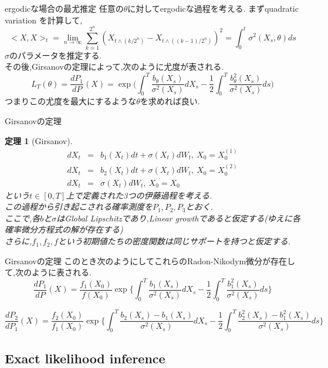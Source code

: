 \documentclass[dvipdfmx,cjk]{beamer}
\numberwithin{equation}{section}
\newtheorem{Thm}     {定理}[section]
\def\thm{\begin{Thm}}
\def\thmx{\end{Thm}}
\def\eqa{\begin{eqnarray}}
\def\eqax{\end{eqnarray}}
\begin{document}
\begin{frame}{ergodicな場合の最尤推定}
任意の$\theta$に対してergodicな過程を考える.\pause 
まずquadratic variation を計算して,
\[
<X,X>_t = \lim_{n\to\infty} \sum_{k=1}^{2^n} (X_{t\wedge (k/2^n)} - X_{t\wedge ((k-1)/2^n)})^2 =
\int_0^t \sigma^2(X_s,\theta)ds 
\]
$\sigma$のパラメータを推定する.\\ \pause
その後,Girsanovの定理によって,次のように尤度が表される.
\[
L_T(\theta) = \frac{dP_1}{dP}(X)  
	= \exp \biggl( \int_0^T \frac{b_\theta(X_s)}{\sigma^2(X_s)} dX_s - 
	\frac{1}{2} \int_0^T \frac{ b_\theta^2(X_s) }{\sigma^2(X_s)} ds
	 \biggl)
\]
つまりこの尤度を最大にするような$\theta$を求めれば良い.\\

\end{frame}

\begin{frame}{Girsanovの定理}
\thm[Girsanov]
\eqa
dX_t &=& b_1(X_t) dt + \sigma(X_t) dW_t ,\ X_0 = X_0^{(1)} \\
dX_t &=& b_2(X_t) dt + \sigma(X_t) dW_t ,\ X_0 = X_0^{(2)} \\
dX_t &=& \sigma(X_t) dW_t ,\ X_0 = X_0
\eqax
という$t\in [0,T]$上で定義された3つの伊藤過程を考える.\\
この過程から引き起こされる確率測度を$P_1,P_2,P_3$とおく.\\
ここで,各$b$と$\sigma$はGlobal Lipschitzであり,Linear growthであると仮定する(ゆえに各確率微分方程式の解が存在する)\\
さらに,$f_1,f_2,f$という初期値たちの密度関数は同じサポートを持つと仮定する.\\

\thmx

\end{frame}
\begin{frame}{Girsanovの定理}
このとき次のようにしてこれらのRadon-Nikodym微分が存在して,次のように表される.
\[
\frac{dP_1}{dP}(X) = \frac{f_1(X_0)}{f(X_0)} 
\exp \biggl\{
	\int_0^T \frac{b_1(X_s)}{\sigma^2(X_s)} dX_s - 
	\frac{1}{2} \int_0^T \frac{ b_1^2(X_s) }{\sigma^2(X_s)} ds
	 \biggl\}
\]

\[
\frac{dP_2}{dP_1}(X) = \frac{f_2(X_0)}{f_1(X_0)} 
\exp \biggl\{
	\int_0^T \frac{b_2(X_s)-b_1(X_s)}{\sigma^2(X_s)} dX_s - 
	\frac{1}{2} \int_0^T \frac{b_2^2(X_s)- b_1^2(X_s) }{\sigma^2(X_s)} ds
	 \biggl\}
\]
\end{frame}


\subsection{Exact likelihood inference}
\end{document}
